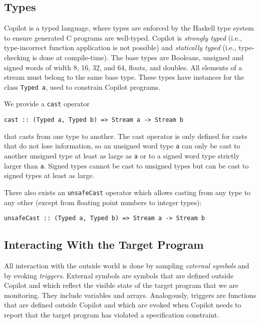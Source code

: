\subsection{Types} \label{sec:types}

Copilot is a typed language, where types are enforced by the Haskell type system
to ensure generated C programs are well-typed.  Copilot is \emph{strongly typed}
(i.e., type-incorrect function application is not possible) and \emph{statically
  typed} (i.e., type-checking is done at compile-time).  The base types are
Booleans, unsigned and signed words of width 8, 16, 32, and 64, floats, and
doubles.  All elements of a stream must belong to the same base
type.  These types have instances for the class {\tt Typed a}, used to constrain
Copilot programs.

We provide a {\tt cast} operator
%
\begin{lstlisting}[language = Copilot, frame = single]
cast :: (Typed a, Typed b) => Stream a -> Stream b
\end{lstlisting}
%
that casts from one type to another.  The cast operator is only defined for
casts that do not lose information, so an unsigned word type {\tt a} can only be
cast to another unsigned  type at least as large as {\tt a} or to a signed word
type strictly larger than {\tt a}.  Signed types cannot be cast to unsigned
types but can be cast to signed types at least as large.

There also exists an {\tt unsafeCast} operator which allows casting from any
type to any other (except from floating point numbers to integer types):

\begin{lstlisting}[language = Copilot, frame = single]
unsafeCast :: (Typed a, Typed b) => Stream a -> Stream b
\end{lstlisting}

\subsection{Interacting With the Target Program}
\label{subsec:interacting}

All interaction with the outside world is done by sampling \emph{external
  symbols} and by evoking \emph{triggers}.  External symbols are symbols that
are defined outside Copilot and which reflect the visible state of the target
program that we are monitoring.  They include variables and arrays.
Analogously, triggers are functions that are defined outside Copilot and which
are evoked when Copilot needs to report that the target program has violated a
specification constraint.

